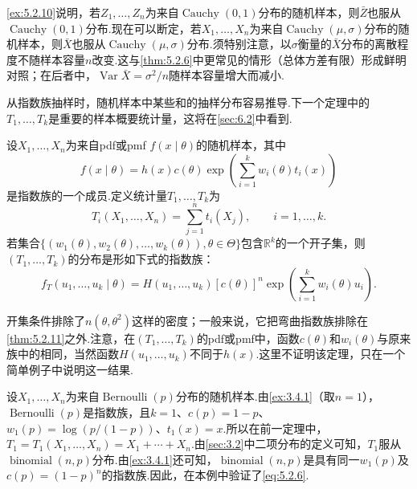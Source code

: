 \autoref{ex:5.2.10}说明，若$Z_1,\ldots,Z_n$为来自$\operatorname{Cauchy}(0,1)$分布的随机样本，则$\bar Z$也服从$\operatorname{Cauchy}(0,1)$分布.现在可以断定，若$X_1,\ldots,X_n$为来自$\operatorname{Cauchy}(\mu,\sigma)$分布的随机样本，则$\bar X$也服从$\operatorname{Cauchy}(\mu,\sigma)$分布.须特别注意，以$\sigma$衡量的$\bar X$分布的离散程度不随样本容量$n$改变.这与\autoref{thm:5.2.6}中更常见的情形（总体方差有限）形成鲜明对照；在后者中，$\operatorname{Var}\bar X=\sigma^2/n$随样本容量增大而减小.

从指数族抽样时，随机样本中某些和的抽样分布容易推导.下一个定理中的$T_1,\ldots,T_k$是重要的样本概要统计量，这将在\autoref{sec:6.2}中看到.
\begin{theorem}\label{thm:5.2.11}
设$X_1,\ldots,X_n$为来自pdf或pmf $f(x\mid\theta)$的随机样本，其中
$$f(x\mid\theta)=h(x)c(\theta)\exp\left(\sum_{i=1}^k w_i(\theta)t_i(x)\right)$$
是指数族的一个成员.定义统计量$T_1,\ldots,T_k$为
$$T_i(X_1,\ldots,X_n)=\sum_{j=1}^n t_i(X_j),\qquad i=1,\ldots,k.$$
若集合$\{(w_1(\theta),w_2(\theta),\ldots,w_k(\theta)),\theta\in\Theta\}$包含$\mathbb R^k$的一个开子集，则$(T_1,\ldots,T_k)$的分布是形如下式的指数族：
\begin{equation}\label{eq:5.2.6}
f_T(u_1,\ldots,u_k\mid\theta)=H(u_1,\ldots,u_k)[c(\theta)]^n\exp\left(\sum_{i=1}^k w_i(\theta)u_i\right).
\end{equation}
\end{theorem}
开集条件排除了$n(\theta,\theta^2)$这样的密度；一般来说，它把弯曲指数族排除在\autoref{thm:5.2.11}之外.注意，在$(T_1,\ldots,T_k)$的pdf或pmf中，函数$c(\theta)$和$w_i(\theta)$与原来族中的相同，当然函数$H(u_1,\ldots,u_k)$不同于$h(x)$.这里不证明该定理，只在一个简单例子中说明这一结果.
\begin{example}[Bernoulli随机变量之和]\label{ex:5.2.12}
设$X_1,\ldots,X_n$为来自$\operatorname{Bernoulli}(p)$分布的随机样本.由\autoref{ex:3.4.1}（取$n=1$），$\operatorname{Bernoulli}(p)$是指数族，且$k=1$、$c(p)=1-p$、$w_1(p)=\log(p/(1-p))$、$t_1(x)=x$.所以在前一定理中，$T_1=T_1(X_1,\ldots,X_n)=X_1+\cdots+X_n$.由\autoref{sec:3.2}中二项分布的定义可知，$T_1$服从$\operatorname{binomial}(n,p)$分布.由\autoref{ex:3.4.1}还可知，$\operatorname{binomial}(n,p)$是具有同一$w_1(p)$及$c(p)=(1-p)^n$的指数族.因此，在本例中验证了\eqref{eq:5.2.6}.
\end{example}
